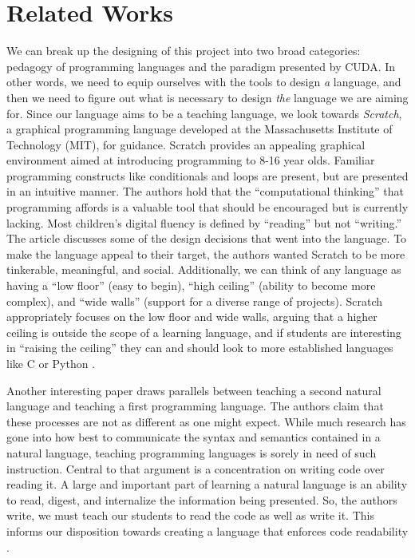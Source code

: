\documentclass{article}
\begin{document}
\section{Related Works}

We can break up the designing of this project into two broad categories: pedagogy of programming languages and the paradigm presented by CUDA. In other words, we need to equip ourselves with the tools to design {\em a} language, and then we need to figure out what is necessary to design {\em the} language we are aiming for. Since our language aims to be a teaching language, we look towards {\em Scratch}, a graphical programming language developed at the Massachusetts Institute of Technology (MIT), for guidance. Scratch provides an appealing graphical environment aimed at introducing programming to 8-16 year olds. Familiar programming constructs like conditionals and loops are present, but are presented in an intuitive manner. The authors hold that the ``computational thinking'' that programming affords is a valuable tool that should be encouraged but is currently lacking. Most children's digital fluency is defined by ``reading'' but not ``writing.'' The article discusses some of the design decisions that went into the language. To make the language appeal to their target, the authors wanted Scratch to be more tinkerable, meaningful, and social. Additionally, we can think of any language as having a ``low floor'' (easy to begin), ``high ceiling'' (ability to become more complex), and ``wide walls'' (support for a diverse range of projects). Scratch appropriately focuses on the low floor and wide walls, arguing that a higher ceiling is outside the scope of a learning language, and if students are interesting in ``raising the ceiling'' they can and should look to more established languages like C or Python \cite{resnick}.

Another interesting paper draws parallels between teaching a second natural language and teaching a first programming language. The authors claim that these processes are not as different as one might expect. While much research has gone into how best to communicate the syntax and semantics contained in a natural language, teaching programming languages is sorely in need of such instruction. Central to that argument is a concentration on writing code over reading it. A large and important part of learning a natural language is an ability to read, digest, and internalize the information being presented. So, the authors write, we must teach our students to read the code as well as write it. This informs our disposition towards creating a language that enforces code readability \cite{robertson}.
\end{document}
